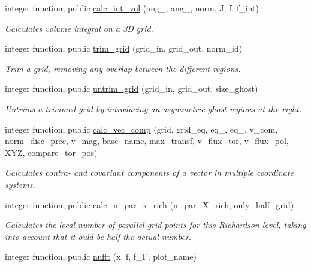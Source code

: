 \begin{DoxyCompactItemize}
integer function, public \hyperlink{namespacegrid__utilities_a97e3106dbdc10b726af74afa113ba533}{calc\+\_\+int\+\_\+vol} (ang\+\_, ang\+\_, norm, J, f, f\+\_\+int)
\begin{DoxyCompactList}\small\item\em Calculates volume integral on a 3D grid. \end{DoxyCompactList}\item 
integer function, public \hyperlink{namespacegrid__utilities_a67001ff9bbcad707aacf17f90a748d90}{trim\+\_\+grid} (grid\+\_\+in, grid\+\_\+out, norm\+\_\+id)
\begin{DoxyCompactList}\small\item\em Trim a grid, removing any overlap between the different regions. \end{DoxyCompactList}\item 
integer function, public \hyperlink{namespacegrid__utilities_a4679f24af8e02793070f4e27b43e00b6}{untrim\+\_\+grid} (grid\+\_\+in, grid\+\_\+out, size\+\_\+ghost)
\begin{DoxyCompactList}\small\item\em Untrims a trimmed grid by introducing an asymmetric ghost regions at the right. \end{DoxyCompactList}\item 
integer function, public \hyperlink{namespacegrid__utilities_ad3d9386b9abcb1a7e17369a1b3a3750d}{calc\+\_\+vec\+\_\+comp} (grid, grid\+\_\+eq, eq\+\_, eq\+\_, v\+\_\+com, norm\+\_\+disc\+\_\+prec, v\+\_\+mag, base\+\_\+name, max\+\_\+transf, v\+\_\+flux\+\_\+tor, v\+\_\+flux\+\_\+pol, X\+YZ, compare\+\_\+tor\+\_\+pos)
\begin{DoxyCompactList}\small\item\em Calculates contra-\/ and covariant components of a vector in multiple coordinate systems. \end{DoxyCompactList}\item 
integer function, public \hyperlink{namespacegrid__utilities_adeb8c22db4d419a278d6fcc68a34100c}{calc\+\_\+n\+\_\+par\+\_\+x\+\_\+rich} (n\+\_\+par\+\_\+\+X\+\_\+rich, only\+\_\+half\+\_\+grid)
\begin{DoxyCompactList}\small\item\em Calculates the local number of parallel grid points for this Richardson level, taking into account that it ould be half the actual number. \end{DoxyCompactList}\item 
integer function, public \hyperlink{namespacegrid__utilities_a0854b2d6cc61a31f68b4afe7304077a9}{nufft} (x, f, f\+\_\+F, plot\+\_\+name)

\end{DoxyCompactItemize}
